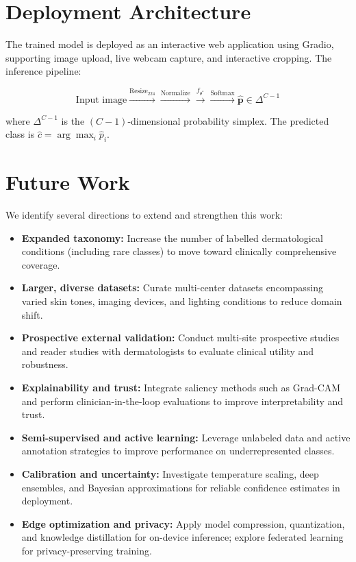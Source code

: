 \documentclass[10pt,a4paper,twocolumn]{article}
\begin{document}
\section{Deployment Architecture}

The trained model is deployed as an interactive web application using Gradio, supporting image upload, live webcam capture, and interactive cropping. The inference pipeline:

\begin{equation}
\text{Input image} \xrightarrow{\text{Resize}_{224}} \xrightarrow{\text{Normalize}} \xrightarrow{f_{\theta^*}} \xrightarrow{\text{Softmax}} \hat{\mathbf{p}} \in \Delta^{C-1}
\end{equation}

where $\Delta^{C-1}$ is the $(C{-}1)$-dimensional probability simplex. The predicted class is $\hat{c} = \arg\max_i \hat{p}_i$.

\section{Future Work}

We identify several directions to extend and strengthen this work:

\begin{itemize}
    \item \textbf{Expanded taxonomy:} Increase the number of labelled dermatological conditions (including rare classes) to move toward clinically comprehensive coverage.
    \item \textbf{Larger, diverse datasets:} Curate multi-center datasets encompassing varied skin tones, imaging devices, and lighting conditions to reduce domain shift.
    \item \textbf{Prospective external validation:} Conduct multi-site prospective studies and reader studies with dermatologists to evaluate clinical utility and robustness.
    \item \textbf{Explainability and trust:} Integrate saliency methods such as Grad-CAM and perform clinician-in-the-loop evaluations to improve interpretability and trust.
    \item \textbf{Semi-supervised and active learning:} Leverage unlabeled data and active annotation strategies to improve performance on underrepresented classes.
    \item \textbf{Calibration and uncertainty:} Investigate temperature scaling, deep ensembles, and Bayesian approximations for reliable confidence estimates in deployment.
    \item \textbf{Edge optimization and privacy:} Apply model compression, quantization, and knowledge distillation for on-device inference; explore federated learning for privacy-preserving training.
\end{itemize}
\end{document}
